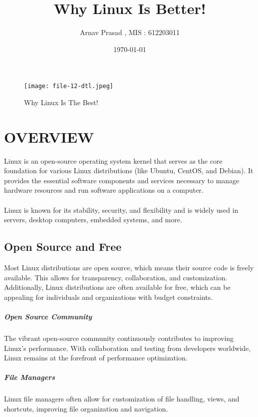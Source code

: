 \documentclass{article}
\begin{document}
\title{Why Linux Is Better!}
\author{Arnav Prasad , MIS : 612203011}
\date{\today}
\maketitle

\newpage
{}
\tableofcontents
\newpage


\begin{figure}
\texttt{[image: file-12-dtl.jpeg]}
\caption{Why Linux Is The Best!}
\label{fig:Why Linux is the best}
\end{figure}

\section{OVERVIEW}
\cite{aa}
Linux is an open-source  operating system kernel that serves as the core foundation for various Linux distributions (like Ubuntu, CentOS, and Debian). It provides the essential software components and services necessary to manage hardware resources and run software applications on a computer. 
\paragraph{}
Linux is known for its stability, security, and flexibility and is widely used in servers, desktop computers, embedded systems, and more.

\subsection{Open Source and Free}
 Most Linux distributions are open source, which means their source code is freely available. This allows for transparency, collaboration, and customization. Additionally, Linux distributions are often available for free, which can be appealing for individuals and organizations with budget constraints.

\subparagraph{Open Source Community}
The vibrant open-source community continuously contributes to improving Linux's performance. With collaboration and testing from developers worldwide, Linux remains at the forefront of performance optimization.

\subparagraph{File Managers}
Linux file managers often allow for customization of file handling, views, and shortcuts, improving file organization and navigation.\cite{aa}
\end{document}
